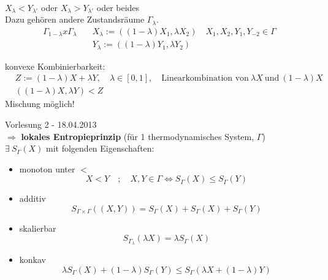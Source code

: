 \documentclass[10pt,article,colorback,accentcolor=tud9d]{tudreport}
\begin{document}
\begin{itemize}
\begin{fleqn}
\begin{equation}
\begin{aligned}
\end{aligned}
\end{equation}
${X}_\lambda < {Y}_{\lambda'}$ oder ${X}_\lambda > {Y}_{\lambda'}$ oder beides\\
Dazu gehören andere Zustandsräume $\Gamma_\lambda$.\\
\begin{equation}
\begin{aligned}
\Gamma_{1-\lambda} x \Gamma_\lambda \quad &X_\lambda :=((1-\lambda)X_1,\lambda X_2) \quad X_1,X_2,Y_1,Y_{-2} \in \Gamma\\
&Y_\lambda :=((1-\lambda)Y_1,\lambda Y_2)
\end{aligned}
\end{equation}

\item konvexe Kombinierbarkeit:\\
\begin{equation}
\begin{aligned}
&Z:=(1-\lambda)X +\lambda Y, \quad \lambda \in [0,1], \quad \text{Linearkombination von} \ \lambda X \ \text{und} \ (1-\lambda)X\\
&((1-\lambda)X,\lambda Y)<Z
\end{aligned}
\end{equation}
Mischung möglich!
\end{fleqn}
\end{itemize}
Vorlesung 2 - 18.04.2013\\
$\Rightarrow$ \textbf{lokales Entropieprinzip} (für 1 thermodynamisches System, $\Gamma$)\\
$\exists \ S_\Gamma(X)$ mit folgenden Eigenschaften: 
\begin{itemize}
\item monoton unter $<$
\begin{equation}
X<Y \quad ; \quad X,Y \in \Gamma \Leftrightarrow S_\Gamma(X) \leq S_\Gamma(Y)
\end{equation}
\item additiv
\begin{equation}
S_{\Gamma \times \Gamma}((X,Y))=S_\Gamma(X)+S_\Gamma(X)+S_\Gamma(Y)
\end{equation}
\item skalierbar 
\begin{equation}
S_{\Gamma_\lambda}(\lambda X)=\lambda S_\Gamma(X)
\end{equation}
\item konkav
\begin{equation}
\lambda S_\Gamma(X)+(1-\lambda)S_\Gamma(Y) \leq S_\Gamma(\lambda X +(1-\lambda)Y)
\end{equation}
\end{itemize}
\end{document}
